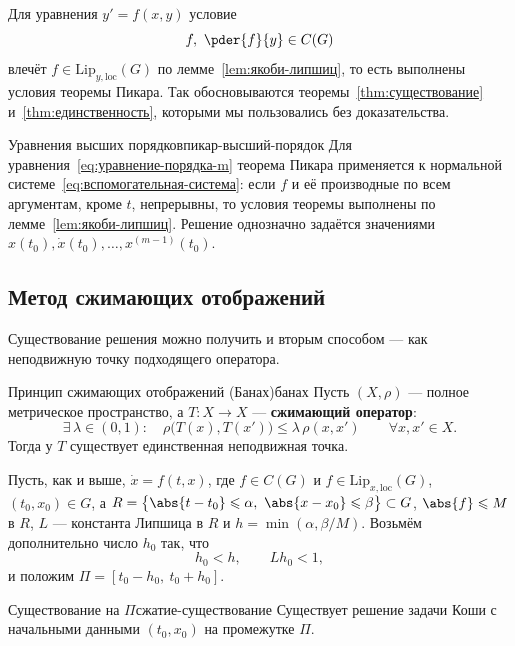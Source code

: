 Для уравнения $y' = f(x,y)$ условие
\[
f,\ \pder{f}{y} \in C(G)
\]
влечёт $f \in \mathrm{Lip}_{y,\mathrm{loc}}(G)$ по лемме~\ref{lem:якоби-липшиц},
то есть выполнены условия теоремы Пикара. Так обосновываются
теоремы~\ref{thm:существование} и~\ref{thm:единственность}, которыми мы
пользовались без доказательства.

\begin{Remark}[addon]{Уравнения высших порядков}{пикар-высший-порядок}
	Для уравнения~\eqref{eq:уравнение-порядка-m} теорема Пикара применяется к
	нормальной системе~\eqref{eq:вспомогательная-система}: если $f$ и её
	производные по всем аргументам, кроме $t$, непрерывны, то условия теоремы
	выполнены по лемме~\ref{lem:якоби-липшиц}. Решение однозначно задаётся
	значениями $x(t_0), \dot x(t_0), \dots, x^{(m-1)}(t_0)$.
\end{Remark}

\subsection{Метод сжимающих отображений}\label{sec:сжимающие}

Существование решения можно получить и вторым способом --- как неподвижную
точку подходящего оператора.

\begin{Theorem}{Принцип сжимающих отображений (Банах)}{банах}
	Пусть $(X, \rho)$ --- полное метрическое пространство, а $T \colon X \to X$
	--- \textbf{сжимающий оператор}:
	\[
	\exists\, \lambda \in (0,1) \colon \quad
	\rho\bigl(T(x), T(x')\bigr) \leqslant \lambda\,\rho(x,x')
	\qquad \forall x, x' \in X .
	\]
	Тогда у $T$ существует единственная неподвижная точка.
\end{Theorem}

Пусть, как и выше, $\dot x = f(t,x)$, где $f \in C(G)$ и
$f \in \mathrm{Lip}_{x,\mathrm{loc}}(G)$, $(t_0,x_0) \in G$, а
$R = \bigl\{\abs{t - t_0} \leqslant \alpha,\ \abs{x - x_0} \leqslant \beta\bigr\}
\subset G$, $\abs{f} \leqslant M$ в $R$, $L$ --- константа Липшица в $R$ и
$h = \min(\alpha, \beta/M)$. Возьмём дополнительно число $h_0$ так, что
\[
h_0 < h, \qquad L h_0 < 1,
\]
и положим $\Pi = [t_0 - h_0,\ t_0 + h_0]$.

\begin{Statement}{Существование на $\Pi$}{сжатие-существование}
	Существует решение задачи Коши с начальными данными $(t_0,x_0)$
	на промежутке $\Pi$.
\end{Statement}

